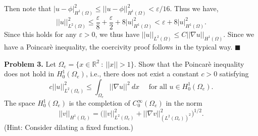 \documentclass[11pt]{article}
\begin{document}
Then note that $|u - \phi|^2_{H^1(\Omega)} \leq ||u - \phi||^2_{H^1(\Omega)} < \varepsilon/16$. 
Thus we have,
\begin{equation*}
    ||u||^2_{L^2(\Omega)} \leq \frac{\varepsilon}{8} + \frac{\varepsilon}{2} + 8|u|^2_{H^1(\Omega)} < \varepsilon + 8|u|^2_{H^1(\Omega)}.
\end{equation*}
Since this holds for any $\varepsilon > 0$, we thus have $||u||_{L^2(\Omega)} \leq C ||\nabla u||_{H^1(\Omega)}$.
Since we have a Poincar\`{e} inequality, the coercivity proof follows in the typical way.
$\blacksquare$


\vskip 2cm


\textbf{Problem 3.} Let $\Omega_e = \{x \in \mathbb{R}^2 \: : \: ||x|| > 1 \}$. 
Show that the Poincar\`{e} inequality does not hold in $H^1_0(\Omega_e)$, i.e., there does not exist a constant $c > 0$ satisfying 
\begin{equation}
    c||u||^2_{L^2(\Omega_e)} \leq \int_{\Omega_e} ||\nabla u||^2 \: dx \quad \text{ for all } u \in H^1_0(\Omega_e).
\end{equation}
The space $H^1_0(\Omega_e)$ is the completion of $C^\infty_0(\Omega_e)$ in the norm 
\begin{equation}
    ||v||_{H^1(\Omega_e)} = \Big(||v||^2_{L^2(\Omega_e)} + ||\nabla v||^2_{(L^2(\Omega_e))^2} \Big)^{1/2}.
\end{equation}
(Hint: Consider dilating a fixed function.)


\vskip 1cm
\end{document}
